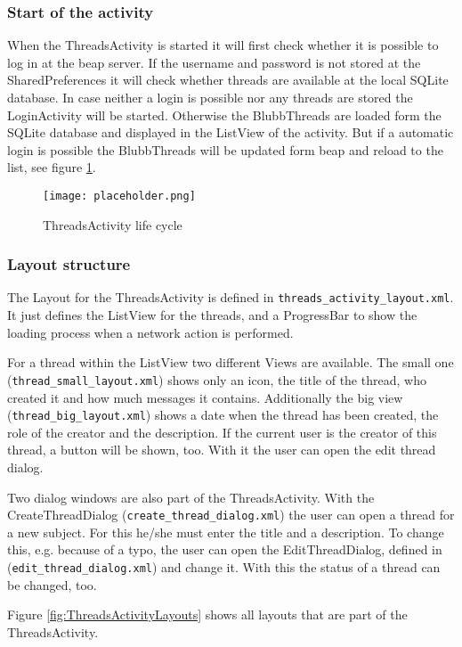 \documentclass[12pt,a4paper,oneside]{report}
\newcommand{\beapServer}{beap server}
\newcommand{\code}[1]{\lstinline{#1}}
\begin{document}
\subsubsection{Start of the activity}
When the ThreadsActivity is started it will first check whether it is possible to log in at the \beapServer{}. If the username and password is not stored at the SharedPreferences it will check whether threads are available at the local SQLite database. In case neither a login is possible nor any threads are stored the LoginActivity will be started. Otherwise the BlubbThreads are loaded form the SQLite database and displayed in the ListView of the activity. But if a automatic login is possible the BlubbThreads will be updated form beap and reload to the list, see figure \ref{fig:ThreadsActivityLC}.

\begin{figure}[!ht]
    \texttt{[image: placeholder.png]}
	\caption{ThreadsActivity life cycle} 
	\label{fig:ThreadsActivityLC}
\end{figure}

\subsubsection{Layout structure}
The Layout for the ThreadsActivity is defined in \code{threads_activity_layout.xml}.
It just defines the ListView for the threads, and a ProgressBar to show the loading process when a network action is performed. 

For a thread within the ListView two different Views are available. The small one (\code{thread_small_layout.xml}) shows only an icon, the title of the thread, who created it and how much messages it contains. Additionally the big view (\code{thread_big_layout.xml}) shows a date when the thread has been created, the role of the creator and the description. If the current user is the creator of this thread, a button will be shown, too. With it the user can open the edit thread dialog. 


Two dialog windows are also part of the ThreadsActivity. With the CreateThreadDialog (\code{create_thread_dialog.xml}) the user can open a thread for a new subject. For this he/she must enter the title and a description. To change this, e.g. because of a typo, the user can open the EditThreadDialog, defined in (\code{edit_thread_dialog.xml}) and change it. With this the status of a thread can be changed, too.

Figure \ref{fig:ThreadsActivityLayouts} shows all layouts that are part of the ThreadsActivity.
\end{document}
